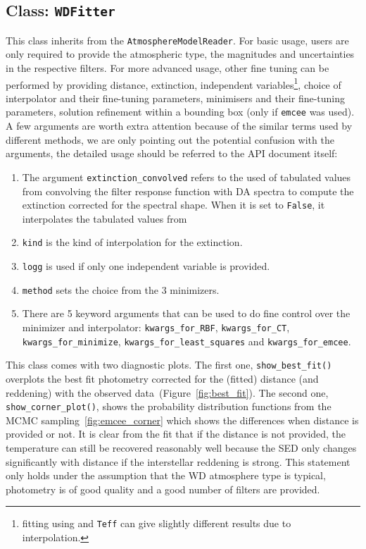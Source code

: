 \documentclass[fleqn,usenatbib]{rasti}
\begin{document}
\subsection{Class: \texttt{WDFitter}}
This class inherits from the \verb+AtmosphereModelReader+. For basic usage,
users are only required to provide the atmospheric type, the magnitudes and
uncertainties in the respective filters. For more advanced usage, other
fine tuning can be performed by providing distance, extinction, independent
variables\footnote{fitting using  and \texttt{Teff} can give slightly
different results due to interpolation.}, choice of interpolator and their
fine-tuning parameters, minimisers and their fine-tuning parameters,
solution refinement within a bounding box (only if \verb+emcee+ was used).
A few arguments are worth extra attention because of the similar terms used
by different methods, we are only pointing out the potential confusion with
the arguments, the detailed usage should be referred to the API document
itself:
\begin{enumerate}
    \item The argument \verb+extinction_convolved+ refers to the used of
    tabulated values from convolving the filter response function with DA
    spectra to compute the extinction corrected for the spectral shape.
    When it is set to \verb+False+, it interpolates the tabulated values
    from \citet{2011ApJ...737..103S}
    \item \verb+kind+ is the kind of interpolation for the extinction.
    \item \verb+logg+ is used if only one independent variable is
    provided.
    \item \verb+method+ sets the choice from the 3 minimizers.
    \item There are 5 keyword arguments that can be used to do fine 
    control over the minimizer and interpolator: \verb+kwargs_for_RBF+,
    \verb+kwargs_for_CT+, \verb+kwargs_for_minimize+,
    \verb+kwargs_for_least_squares+ and \verb+kwargs_for_emcee+.
\end{enumerate}

This class comes with two diagnostic plots. The first one,
\verb+show_best_fit()+ overplots the best fit photometry corrected for the
(fitted) distance (and reddening) with the observed
data~(Figure~\ref{fig:best_fit}). The second one, \verb+show_corner_plot()+,
shows the probability distribution functions from the MCMC
sampling~\ref{fig:emcee_corner} which shows the differences when distance
is provided or not. It is clear from the fit that if the distance is not
provided, the temperature can still be recovered reasonably well because
the SED only changes significantly with distance if the interstellar
reddening is strong. This statement only holds under the assumption that
the WD atmosphere type is typical, photometry is of good quality and a
good number of filters are provided.
\end{document}
